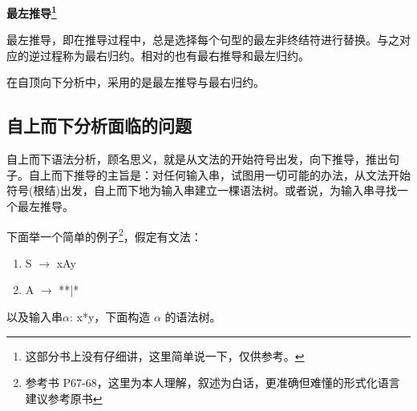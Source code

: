 \noindent\textbf{最左推导\footnote{这部分书上没有仔细讲，这里简单说一下，仅供参考。}}

最左推导，即在推导过程中，总是选择每个句型的最左非终结符进行替换。与之对应的逆过程称为最右归约。相对的也有最右推导和最左归约。

在自顶向下分析中，采用的是最左推导与最右归约。




\subsection{自上而下分析面临的问题}

自上而下语法分析，顾名思义，就是从文法的开始符号出发，向下推导，推出句子。自上而下推导的主旨是：对任何输入串，试图用一切可能的办法，从文法开始符号(根结)出发，自上而下地为输入串建立一棵语法树。或者说，为输入串寻找一个最左推导。

下面举一个简单的例子\footnote{参考书 P67-68，这里为本人理解，叙述为白话，更准确但难懂的形式化语言建议参考原书}，假定有文法：
\begin{enumerate}
    \item[(1)] S $\rightarrow$ xAy
    \item[(2)] A $\rightarrow$ **|*
\end{enumerate}

以及输入串$\alpha$: x*y，下面构造 $\alpha$ 的语法树。

